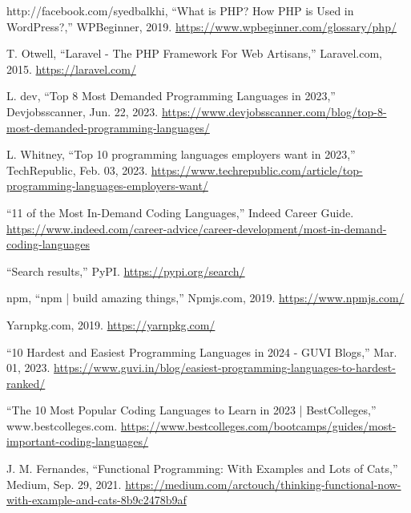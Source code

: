 \documentclass[12pt]{report} %
\begin{document}
\begin{singlespace}
\begin{thebibliography}{}
             http://facebook.com/syedbalkhi, “What is PHP? How PHP is Used in WordPress?,” WPBeginner, 2019. \href{https://www.wpbeginner.com/glossary/php/}{https://www.wpbeginner.com/glossary/php/}

             T. Otwell, “Laravel - The PHP Framework For Web Artisans,” Laravel.com, 2015. \href{https://laravel.com/}{https://laravel.com/}

             L. dev, “Top 8 Most Demanded Programming Languages in 2023,” Devjobsscanner, Jun. 22, 2023. \href{https://www.devjobsscanner.com/blog/top-8-most-demanded-programming-languages/}{https://www.devjobsscanner.com/blog/top-8-most-demanded-programming-languages/}

             L. Whitney, “Top 10 programming languages employers want in 2023,” TechRepublic, Feb. 03, 2023. \href{https://www.techrepublic.com/article/top-programming-languages-employers-want/}{https://www.techrepublic.com/article/top-programming-languages-employers-want/}

             “11 of the Most In-Demand Coding Languages,” Indeed Career Guide. \href{https://www.indeed.com/career-advice/career-development/most-in-demand-coding-languages}{https://www.indeed.com/career-advice/career-development/most-in-demand-coding-languages}

             “Search results,” PyPI. \href{https://pypi.org/search/}{https://pypi.org/search/}

             npm, “npm | build amazing things,” Npmjs.com, 2019. \href{https://www.npmjs.com/}{https://www.npmjs.com/}

             Yarnpkg.com, 2019. \href{https://yarnpkg.com/}{https://yarnpkg.com/}

             “10 Hardest and Easiest Programming Languages in 2024 - GUVI Blogs,” Mar. 01, 2023. \href{https://www.guvi.in/blog/easiest-programming-languages-to-hardest-ranked/}{https://www.guvi.in/blog/easiest-programming-languages-to-hardest-ranked/}

             “The 10 Most Popular Coding Languages to Learn in 2023 | BestColleges,” www.bestcolleges.com. \href{https://www.bestcolleges.com/bootcamps/guides/most-important-coding-languages/}{https://www.bestcolleges.com/bootcamps/guides/most-important-coding-languages/}

             J. M. Fernandes, “Functional Programming: With Examples and Lots of Cats,” Medium, Sep. 29, 2021. \href{https://medium.com/arctouch/thinking-functional-now-with-example-and-cats-8b9c2478b9af}{https://medium.com/arctouch/thinking-functional-now-with-example-and-cats-8b9c2478b9af}


\end{thebibliography}
\end{singlespace}
\end{document}
